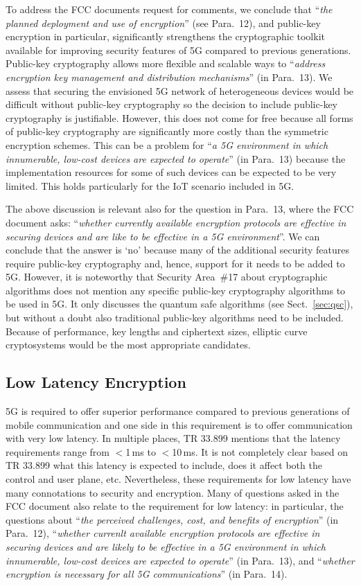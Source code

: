 \documentclass[12pt]{llncs}
\newcommand\ques[1]{``\emph{#1}''}
\begin{document}
To address the FCC documents request for comments, we conclude that \ques{the planned deployment and use of encryption} (see Para.~12), and public-key encryption in particular, significantly strengthens the cryptographic toolkit available for improving security features of 5G compared to previous generations. Public-key cryptography allows more flexible and scalable ways to \ques{address encryption key management and distribution mechanisms} (in Para.~13). We assess that securing the envisioned 5G network of heterogeneous devices would be difficult without public-key cryptography so the decision to include public-key cryptography is justifiable. However, this does not come for free because all forms of public-key cryptography are significantly more costly than the symmetric encryption schemes. This can be a problem for \ques{a 5G environment in which innumerable, low-cost devices are expected to operate} (in Para.~13) because the implementation resources for some of such devices can be expected to be very limited. This holds particularly for the IoT scenario included in 5G.

The above discussion is relevant also for the question in Para.~13, where the FCC document asks: \ques{whether currently available encryption protocols are effective in securing devices and are like to be effective in a 5G environment}. We can conclude that the answer  is `no' because many of the additional security features require public-key cryptography and, hence, support for it needs to be added to 5G. However, it is noteworthy that Security Area~\#17 about cryptographic algorithms does not mention any specific public-key cryptography algorithms to be used in 5G. It only discusses the quantum safe algorithms (see Sect.~\ref{sec:qsc}), but without a doubt also traditional public-key algorithms need to be included. Because of performance, key lengths and ciphertext sizes, elliptic curve cryptosystems would be the most appropriate candidates.

\subsection{Low Latency Encryption}
\label{sec:latency}

5G is required to offer superior performance compared to previous generations of mobile communication and one side in this requirement is to offer communication with very low latency. In multiple places, TR 33.899 mentions that the latency requirements range from $<$1\,ms to $<$10\,ms. It is not completely clear based on TR 33.899 what this latency is expected to include, does it affect both the control and user plane, etc. Nevertheless, these requirements for low latency have many connotations to security and encryption. Many of questions asked in the FCC document also relate to the requirement for low latency: in particular, the questions about \ques{the perceived challenges, cost, and benefits of encryption} (in Para.~12), \ques{whether currenlt available encryption protocols are effective in securing devices and are likely to be effective in a 5G environment in which innumerable, low-cost devices are expected to operate} (in Para.~13), and \ques{whether encryption is necessary for all 5G communications} (in Para.~14). 
\end{document}
